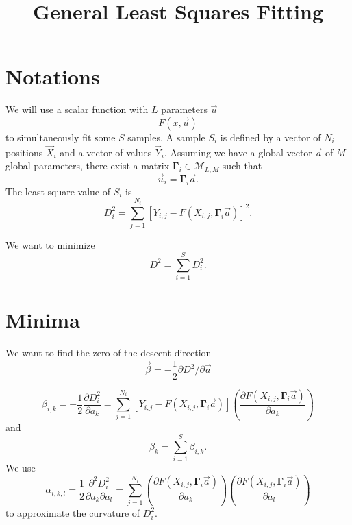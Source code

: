 \documentclass[aps,twocolumn]{revtex4}
\newcommand{\mymat}[1]{\bm{#1}}
\begin{document}
\title{General Least Squares Fitting}
\maketitle

\section{Notations}
We will use a scalar function with $L$ parameters $\vec{u}$
\begin{equation}
	F(x,\vec{u})
\end{equation}
to simultaneously fit some $S$ samples.
A sample $S_i$ is defined by a vector of $N_i$ positions $\vec{X}_i$ and
a vector of values $\vec{Y}_i$.
Assuming we have a global vector $\vec{a}$ of $M$ global parameters, there exist a
matrix $\mymat{\Gamma}_i\in\mathcal{M}_{L,M}$
such that
\begin{equation}
	\vec{u}_i = \mymat{\Gamma}_i \vec{a}.
\end{equation}
The least square value of $S_i$ is
\begin{equation}
	D^2_i = \sum_{j=1}^{N_i} \left[ Y_{i,j} - F\left(X_{i,j},\mymat{\Gamma}_i \vec{a}\right)\right]^2.
\end{equation}

We want to minimize 
\begin{equation}
	D^2 = \sum_{i=1}^{S} D^2_i.
\end{equation}

\section{Minima}
We want to find the zero of the descent direction
$$\vec{\beta}=-\dfrac{1}{2}\partial D^2 / \partial \vec{a}$$

\begin{equation}
	\beta_{i,k} = -\dfrac{1}{2}\dfrac{\partial D_i^2}{\partial a_k} 
	= \sum_{j=1}^{N_i} \left[
	Y_{i,j} - F\left(X_{i,j},\mymat{\Gamma}_i \vec{a}\right)
	\right] 
	\left(\dfrac{\partial F(X_{i,j},\mymat{\Gamma}_i \vec{a})}{\partial a_k}\right)
\end{equation}
and
\begin{equation}
	\beta_k = \sum_{i=1}^{S} \beta_{i,k}.
\end{equation}
We use
\begin{equation}
	\alpha_{i,k,l} = \dfrac{1}{2} \dfrac{\partial^2 D_i^2}{\partial a_k\partial a_l} =
	\sum_{j=1}^{N_i} 
	 \left(\dfrac{\partial F(X_{i,j},\mymat{\Gamma}_i \vec{a})}{\partial a_k}\right) \left(\dfrac{\partial F(X_{i,j},\mymat{\Gamma}_i \vec{a})}{\partial a_l}\right) 
\end{equation}
to approximate the curvature of $D_i^2$.
\end{document}
